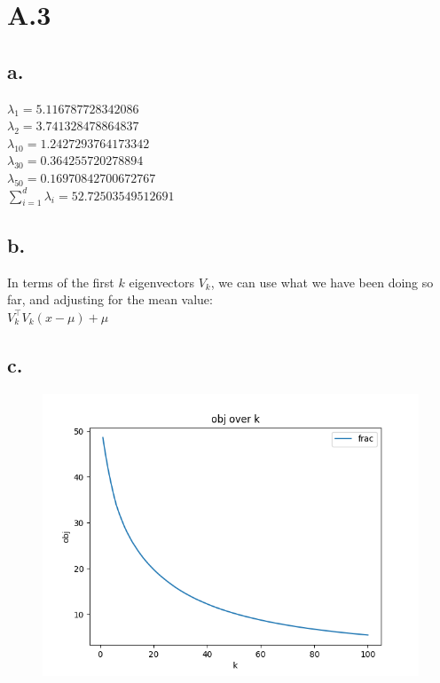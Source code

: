 \documentclass{article}
\newcommand{\1}{\mathbf{1}}
\begin{document}
\section*{A.3}
{\Large 

\subsection*{a.}

$\lambda_1 = 5.116787728342086$ \\
$\lambda_2 = 3.741328478864837$ \\
$\lambda_{10} = 1.2427293764173342$ \\
$\lambda_{30} = 0.364255720278894$ \\
$\lambda_{50} = 0.16970842700672767$ \\
$\sum_{i=1}^d{\lambda_i} = 52.72503549512691$

\subsection*{b.}

In terms of the first $k$ eigenvectors $V_k$, we can use what we have been doing so far, and adjusting for the mean value: \\
$V_k^\top V_k (x - \mu) + \mu$

\subsection*{c.}

\begin{figure}[h]
  \centering
  \includegraphics[width=130mm]{../hw4-code/results/a3_cobj.png}
\end{figure}

}
\end{document}
